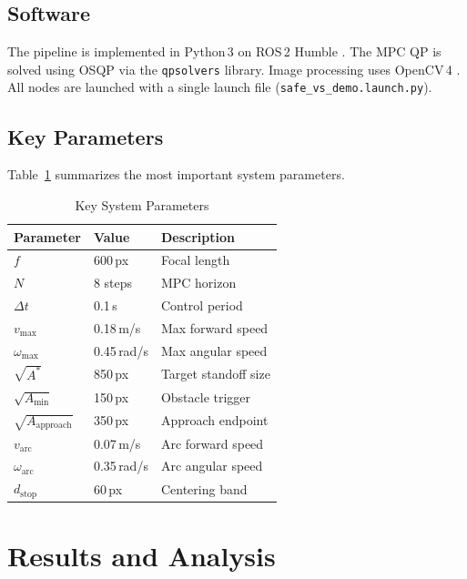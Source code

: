 \documentclass[journal, 10pt]{IEEEtran}
\begin{document}
\subsection{Software}

The pipeline is implemented in Python\,3 on ROS\,2 Humble \cite{ros2}.
The MPC QP is solved using OSQP via the \texttt{qpsolvers} library. Image
processing uses OpenCV\,4 \cite{opencv}. All nodes are launched with a
single launch file (\texttt{safe\_vs\_demo.launch.py}).

\subsection{Key Parameters}

Table~\ref{tab:params} summarizes the most important system parameters.

\begin{table}[H]
\centering
\caption{Key System Parameters}
\label{tab:params}
\begin{tabular}{llp{3.5cm}}
\toprule
\textbf{Parameter} & \textbf{Value} & \textbf{Description} \\
\midrule
$f$                          & 600\,px       & Focal length \\
$N$                          & 8 steps       & MPC horizon \\
$\Delta t$                   & 0.1\,s        & Control period \\
$v_{\max}$                   & 0.18\,m/s     & Max forward speed \\
$\omega_{\max}$              & 0.45\,rad/s   & Max angular speed \\
$\sqrt{A^*}$                 & 850\,px       & Target standoff size \\
$\sqrt{A_{\min}}$            & 150\,px       & Obstacle trigger \\
$\sqrt{A_{\text{approach}}}$ & 350\,px       & Approach endpoint \\
$v_{\text{arc}}$             & 0.07\,m/s     & Arc forward speed \\
$\omega_{\text{arc}}$        & 0.35\,rad/s   & Arc angular speed \\
$d_{\text{stop}}$            & 60\,px        & Centering band \\
\bottomrule
\end{tabular}
\end{table}

\section{Results and Analysis}
\label{sec:results}
\end{document}
